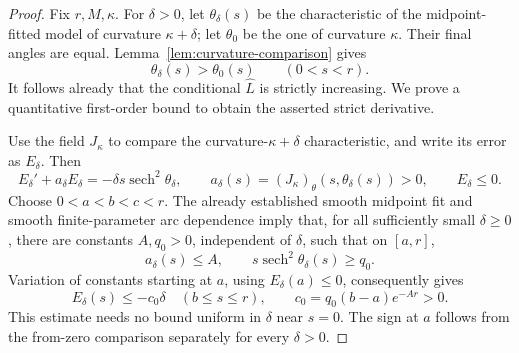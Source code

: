 \begin{proof}
Fix \(r,M,\kappa\).  For \(\delta>0\), let \(\theta_\delta(s)\)
be the characteristic of the midpoint-fitted model of curvature
\(\kappa+\delta\); let \(\theta_0\) be the one of curvature \(\kappa\).
Their final angles are equal.  Lemma~\ref{lem:curvature-comparison}
gives
\begin{equation}\label{eq:fit-interior-order}
 \theta_\delta(s)>\theta_0(s)\qquad(0<s<r).
\end{equation}
It follows already that the conditional \(\widehat L\) is strictly
increasing.  We prove a quantitative first-order bound to obtain
the asserted strict derivative.

Use the field \(J_\kappa\) to compare the curvature-\(\kappa+\delta\)
characteristic, and write its error as \(E_\delta\).  Then
\[
 E_\delta'+a_\delta E_\delta
    =-\delta s\operatorname{sech}^2\theta_\delta,
 \qquad
 a_\delta(s)=(J_\kappa)_\theta(s,\theta_\delta(s))>0,
 \qquad E_\delta\le0.
\]
Choose \(0<a<b<c<r\).  The already established smooth midpoint
fit and smooth finite-parameter arc dependence imply that, for all
sufficiently small \(\delta\ge0\), there are constants \(A,q_0>0\),
independent of \(\delta\), such that on \([a,r]\),
\[
 a_\delta(s)\le A,\qquad
 s\operatorname{sech}^2\theta_\delta(s)\ge q_0.
\]
Variation of constants starting at \(a\), using
\(E_\delta(a)\le0\), consequently gives
\begin{equation}\label{eq:fit-error-quantitative}
 E_\delta(s)\le-c_0\delta\quad(b\le s\le r),
 \qquad c_0=q_0(b-a)e^{-Ar}>0.
\end{equation}
This estimate needs no bound uniform in \(\delta\) near \(s=0\).
The sign at \(a\) follows from the from-zero comparison separately
for every \(\delta>0\).


\end{proof}
